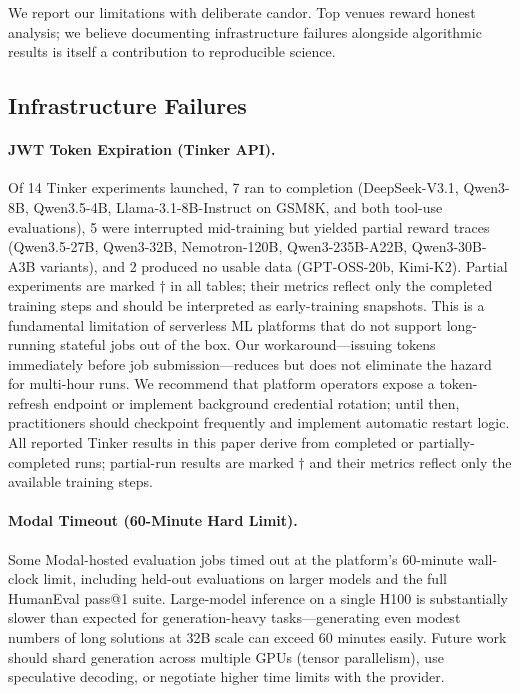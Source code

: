 \documentclass{article}
\begin{document}
We report our limitations with deliberate candor. Top venues reward honest
analysis; we believe documenting infrastructure failures alongside algorithmic
results is itself a contribution to reproducible science.

\subsection{Infrastructure Failures}
\label{sec:infra_failures}

\paragraph{JWT Token Expiration (Tinker API).}
Of 14 Tinker experiments launched, 7 ran to completion (DeepSeek-V3.1,
Qwen3-8B, Qwen3.5-4B, Llama-3.1-8B-Instruct on GSM8K, and both tool-use
evaluations), 5 were interrupted mid-training but yielded partial reward
traces (Qwen3.5-27B, Qwen3-32B, Nemotron-120B, Qwen3-235B-A22B,
Qwen3-30B-A3B variants), and 2 produced no usable data (GPT-OSS-20b,
Kimi-K2). Partial experiments are marked $\dagger$ in all tables; their
metrics reflect only the completed training steps and should be interpreted
as early-training snapshots. This is a fundamental
limitation of serverless ML platforms that do not support long-running
stateful jobs out of the box. Our workaround---issuing tokens immediately
before job submission---reduces but does not eliminate the hazard for
multi-hour runs. We recommend that platform operators expose a token-refresh
endpoint or implement background credential rotation; until then, practitioners
should checkpoint frequently and implement automatic restart logic. All
reported Tinker results in this paper derive from completed or partially-completed
runs; partial-run results are marked $\dagger$ and their metrics reflect
only the available training steps.

\paragraph{Modal Timeout (60-Minute Hard Limit).}
Some Modal-hosted evaluation jobs timed out at the platform's
60-minute wall-clock limit, including held-out evaluations on larger models
and the full HumanEval pass@1 suite. Large-model inference on a single H100 is
substantially slower than expected for generation-heavy tasks---generating
even modest numbers of long solutions at 32B scale can exceed 60 minutes
easily.
Future work should shard generation across multiple GPUs (tensor parallelism),
use speculative decoding, or negotiate higher time limits with the provider.
\end{document}

